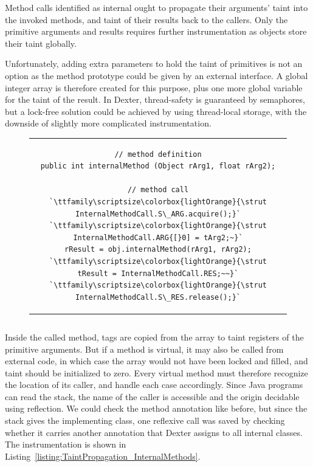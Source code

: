 \documentclass[12pt,twoside,notitlepage]{report}
\newcommand{\highlight}[1]{\colorbox{lightOrange}{\strut #1}}
\newcommand{\lsthl}[1] {\ttfamily\scriptsize\highlight{#1}}
\begin{document}
Method calls identified as internal ought to propagate their arguments' taint into the invoked methods, and taint of their results back to the callers. Only the primitive arguments and results requires further instrumentation as objects store their taint globally. 

Unfortunately, adding extra parameters to hold the taint of primitives is not an option as the method prototype could be given by an external interface. A global integer array is therefore created for this purpose, plus one more global variable for the taint of the result. In Dexter, thread-safety is guaranteed by semaphores, but a lock-free solution could be achieved by using thread-local storage, with the downside of slightly more complicated instrumentation.

\begin{figure}[h]
	\centering
	\begin{tabular}{c}
	\begin{lstlisting}
// method definition
public int internalMethod (Object rArg1, float rArg2);

// method call
`\lsthl{InternalMethodCall.S\_ARG.acquire();}`
`\lsthl{InternalMethodCall.ARG{[}0] = tArg2;~}`
rResult = obj.internalMethod(rArg1, rArg2);
`\lsthl{tResult = InternalMethodCall.RES;~~}`
`\lsthl{InternalMethodCall.S\_RES.release();}`
	\end{lstlisting}
	\end{tabular}
	\begin{lstlisting}[caption={Instrumentation of internal method calls},
	                   label={listing:TaintPropagation_InternalMethodCall}]
	\end{lstlisting}
\end{figure}

Inside the called method, tags are copied from the array to taint registers of the primitive arguments. But if a method is virtual, it may also be called from external code, in which case the array would not have been locked and filled, and taint should be initialized to zero. Every virtual method must therefore recognize the location of its caller, and handle each case accordingly. Since Java programs can read the stack, the name of the caller is accessible and the origin decidable using reflection. We could check the method annotation like before, but since the stack gives the implementing class, one reflexive call was saved by checking whether it carries another annotation that Dexter assigns to all internal classes. The instrumentation is shown in Listing~\ref{listing:TaintPropagation_InternalMethods}.
\end{document}
